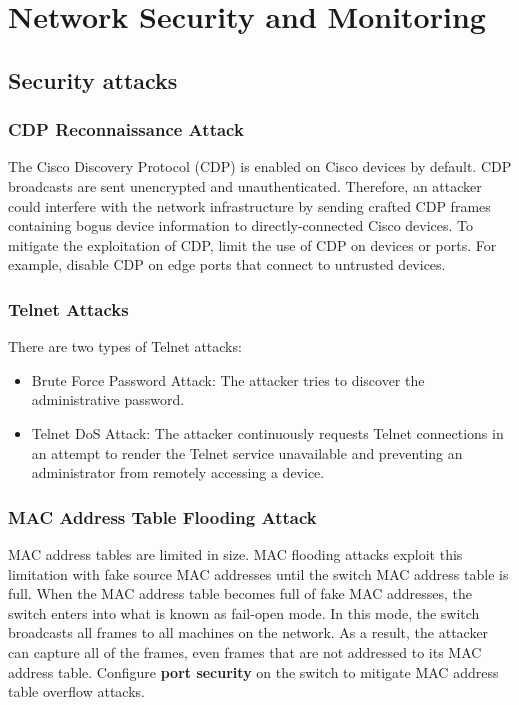 \chapter{Network Security and Monitoring}

\section{Security attacks}

\subsection{CDP Reconnaissance Attack}

The Cisco Discovery Protocol (CDP) is enabled on Cisco devices by default. CDP broadcasts are sent unencrypted and unauthenticated. Therefore, an attacker could interfere with the network infrastructure by sending crafted CDP frames containing bogus device information to directly-connected Cisco devices. To mitigate the exploitation of CDP, limit the use of CDP on devices or ports. For example, disable CDP on edge ports that connect to untrusted devices. 

\subsection{Telnet Attacks}

There are two types of Telnet attacks:
\begin{itemize}
\item Brute Force Password Attack: The attacker tries to discover the administrative password. 
\item Telnet DoS Attack: The attacker continuously requests Telnet connections in an attempt to render the Telnet service unavailable and preventing an administrator from remotely accessing a device.
\end{itemize}

\subsection{MAC Address Table Flooding Attack}

MAC address tables are limited in size. MAC flooding attacks exploit this limitation with fake source MAC addresses until the switch MAC address table is full. When the MAC address table becomes full of fake MAC addresses, the switch enters into what is known as fail-open mode. In this mode, the switch broadcasts all frames to all machines on the network. As a result, the attacker can capture all of the frames, even frames that are not addressed to its MAC address table. Configure \textbf{port security} on the switch to mitigate MAC address table overflow attacks.

